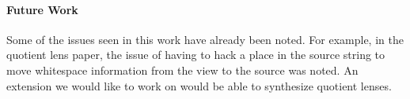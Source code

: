 \documentclass[acmsmall]{acmart}
\begin{document}





\iffull
\paragraph*{Future Work}
Some of the issues seen in this work have already been noted.  For example, in the
quotient lens paper, the issue of having to hack a place in the source string to
move whitespace information from the view to the source was noted.  An extension
we would like to work on would be able to synthesize quotient lenses.
\end{document}
